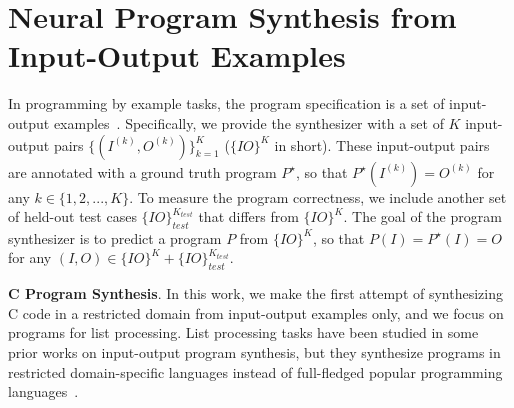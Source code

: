 \vspace{-0.1in}
\section{Neural Program Synthesis from Input-Output Examples}
\vspace{-0.1in}
In programming by example tasks, the program specification is a set of input-output examples~\cite{devlin2017robustfill,bunel2018leveraging}. Specifically, we provide the synthesizer with a set of $K$ input-output pairs $\{(I^{(k)}, O^{(k)})\}_{k=1}^K$ ($\{IO\}^K$ in short). These input-output pairs are annotated with a ground truth program $P^\star$, so that $P^\star(I^{(k)})=O^{(k)}$ for any $k \in \{1, 2, ..., K\}$. To measure the program correctness, we include another set of held-out test cases $\{IO\}_{test}^{K_{test}}$ that differs from $\{IO\}^K$. The goal of the program synthesizer is to predict a program $P$ from $\{IO\}^K$, so that $P(I)=P^\star(I)=O$ for any $(I, O) \in \{IO\}^K + \{IO\}_{test}^{K_{test}}$.

\textbf{C Program Synthesis}. In this work, we make the first attempt of synthesizing C code in a restricted domain from input-output examples only, and we focus on programs for list processing. List processing tasks have been studied in some prior works on input-output program synthesis, but they synthesize programs in restricted domain-specific languages instead of full-fledged popular programming languages~\cite{balog2016deepcoder,odena2020learning,odena2020bustle}. 

